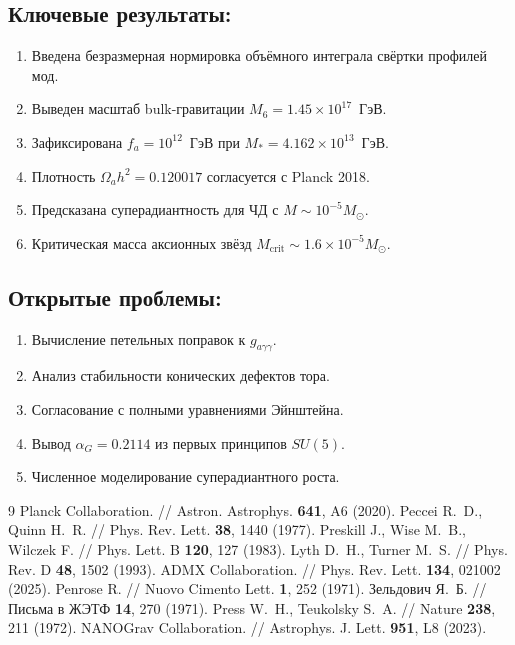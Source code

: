 \documentclass[12pt,a4paper]{article}
\begin{document}
\subsection*{Ключевые результаты:}
\begin{enumerate}
\item Введена безразмерная нормировка объёмного интеграла свёртки профилей мод.
\item Выведен масштаб bulk-гравитации $M_6 = 1.45 \times 10^{17}$~ГэВ.
\item Зафиксирована $f_a = 10^{12}$~ГэВ при $M_* = 4.162 \times 10^{13}$~ГэВ.
\item Плотность $\Omega_a h^2 = 0.120017$ согласуется с Planck 2018.
\item Предсказана суперадиантность для ЧД с $M \sim 10^{-5} M_\odot$.
\item Критическая масса аксионных звёзд $M_{\text{crit}} \sim 1.6 \times 10^{-5} M_\odot$.
\end{enumerate}

\subsection*{Открытые проблемы:}
\begin{enumerate}
\item Вычисление петельных поправок к $g_{a\gamma\gamma}$.
\item Анализ стабильности конических дефектов тора.
\item Согласование с полными уравнениями Эйнштейна.
\item Вывод $\alpha_G = 0.2114$ из первых принципов $SU(5)$.
\item Численное моделирование суперадиантного роста.
\end{enumerate}

\begin{thebibliography}{9}
 Planck Collaboration. // Astron. Astrophys. \textbf{641}, A6 (2020).
 Peccei R.~D., Quinn H.~R. // Phys. Rev. Lett. \textbf{38}, 1440 (1977).
 Preskill J., Wise M.~B., Wilczek F. // Phys. Lett. B \textbf{120}, 127 (1983).
 Lyth D.~H., Turner M.~S. // Phys. Rev. D \textbf{48}, 1502 (1993).
 ADMX Collaboration. // Phys. Rev. Lett. \textbf{134}, 021002 (2025).
 Penrose R. // Nuovo Cimento Lett. \textbf{1}, 252 (1971).
 Зельдович Я.~Б. // Письма в ЖЭТФ \textbf{14}, 270 (1971).
 Press W.~H., Teukolsky S.~A. // Nature \textbf{238}, 211 (1972).
 NANOGrav Collaboration. // Astrophys. J. Lett. \textbf{951}, L8 (2023).
\end{thebibliography}
\end{document}
